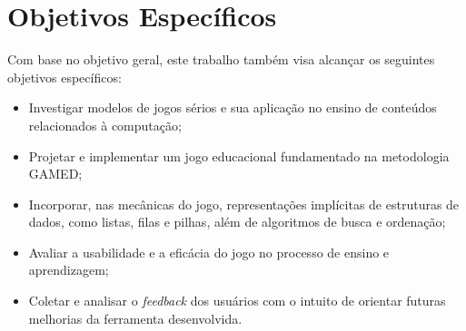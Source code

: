 \section{Objetivos Específicos}

Com base no objetivo geral, este trabalho também visa alcançar os seguintes objetivos específicos:

\begin{itemize}
  \item Investigar modelos de jogos sérios e sua aplicação no ensino de conteúdos relacionados à computação;
  \item Projetar e implementar um jogo educacional fundamentado na metodologia GAMED;
  \item Incorporar, nas mecânicas do jogo, representações implícitas de estruturas de dados, como listas, filas e pilhas, além de algoritmos de busca e ordenação;
  \item Avaliar a usabilidade e a eficácia do jogo no processo de ensino e aprendizagem;
  \item Coletar e analisar o \emph{feedback} dos usuários com o intuito de orientar futuras melhorias da ferramenta desenvolvida.
\end{itemize}
